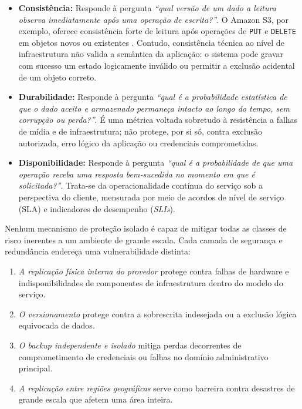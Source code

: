 \documentclass[11pt,a4paper]{article}
\begin{document}
\begin{itemize}[leftmargin=*]
    \item \textbf{Consistência:} Responde à pergunta \textit{``qual versão de um dado a leitura observa imediatamente após uma operação de escrita?''}. O Amazon S3, por exemplo, oferece consistência forte de leitura após operações de \texttt{PUT} e \texttt{DELETE} em objetos novos ou existentes \cite{s3consistency}. Contudo, consistência técnica ao nível de infraestrutura não valida a semântica da aplicação: o sistema pode gravar com sucesso um estado logicamente inválido ou permitir a exclusão acidental de um objeto correto.
    \item \textbf{Durabilidade:} Responde à pergunta \textit{``qual é a probabilidade estatística de que o dado aceito e armazenado permaneça intacto ao longo do tempo, sem corrupção ou perda?''}. É uma métrica voltada sobretudo à resistência a falhas de mídia e de infraestrutura; não protege, por si só, contra exclusão autorizada, erro lógico da aplicação ou credenciais comprometidas.
    \item \textbf{Disponibilidade:} Responde à pergunta \textit{``qual é a probabilidade de que uma operação receba uma resposta bem-sucedida no momento em que é solicitada?''}. Trata-se da operacionalidade contínua do serviço sob a perspectiva do cliente, mensurada por meio de acordos de nível de serviço (SLA) e indicadores de desempenho (\emph{SLIs}).
\end{itemize}

Nenhum mecanismo de proteção isolado é capaz de mitigar todas as classes de risco inerentes a um ambiente de grande escala. Cada camada de segurança e redundância endereça uma vulnerabilidade distinta:
\begin{enumerate}
    \item \textit{A replicação física interna do provedor} protege contra falhas de hardware e indisponibilidades de componentes de infraestrutura dentro do modelo do serviço.
    \item \textit{O versionamento} protege contra a sobrescrita indesejada ou a exclusão lógica equivocada de dados.
    \item \textit{O backup independente e isolado} mitiga perdas decorrentes de comprometimento de credenciais ou falhas no domínio administrativo principal.
    \item \textit{A replicação entre regiões geográficas} serve como barreira contra desastres de grande escala que afetem uma área inteira.
\end{enumerate}
\end{document}
